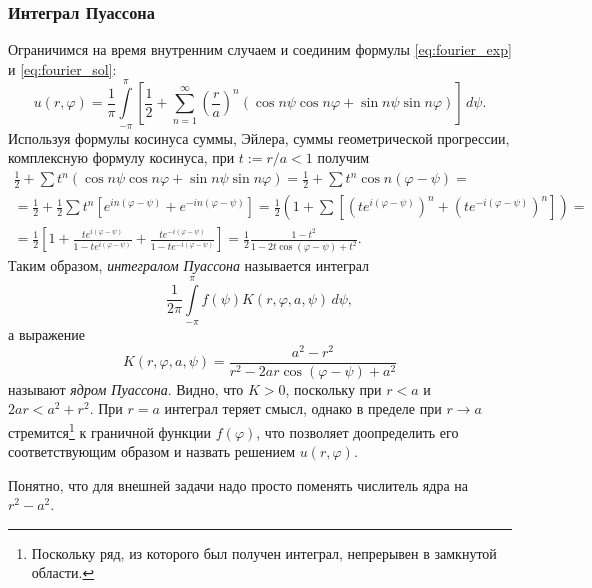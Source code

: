 \subsubsection{Интеграл Пуассона}
Ограничимся на время внутренним случаем и соединим формулы
\eqref{eq:fourier_exp} и \eqref{eq:fourier_sol}:
\[
  u(r,\varphi) = \frac{1}{\pi} \int\limits_{-\pi}^{\pi} \left[ \frac{1}{2} + \sum_{n=1}^\infty \left(
  \frac{r}{a} \right)^n (\cos n\psi\cos n\varphi + \sin n\psi \sin n\varphi
)\right] \, d\psi.
\]
Используя формулы косинуса суммы, Эйлера, суммы геометрической прогрессии,
комплексную формулу косинуса, при
$ t := r/a < 1 $ получим
\begin{multline*}
    \frac{1}{2} + \sum t^n(\cos n\psi \cos n\varphi + \sin n\psi \sin n\varphi)
    = \frac{1}{2} + \sum t^n \cos n(\varphi - \psi) =\\=
    \frac{1}{2} + \frac{1}{2}\sum t^n \left[ e^{in(\varphi-\psi)} +
    e^{-in(\varphi - \psi)} \right] = \frac{1}{2} \left( 1 + \sum \left[
(te^{i(\varphi - \psi)})^n + (te^{-i(\varphi - \psi)})^n \right]  \right) =\\=
  \frac{1}{2} \left[ 1 + \frac{te^{i(\varphi - \psi)}}{1 - te^{i(\varphi-\psi)}}
    + \frac{te^{-i(\varphi - \psi)}}{1 - te^{-i(\varphi-\psi)}}\right] =
    \frac{1}{2} \frac{1 - t^2}{1 - 2t\cos(\varphi - \psi) + t^2}.
\end{multline*}
Таким образом, \emph{интегралом Пуассона} называется интеграл 
\[
    \frac{1}{2\pi} \int\limits_{-\pi}^{\pi}f(\psi) K(r, \varphi, a,
    \psi)\,d\psi,
\]
а выражение  
\[
    K(r,\varphi, a,\psi) = \frac{a^2 - r^2}{r^2 - 2ar\cos(\varphi-\psi) + a^2}
\]
называют \emph{ядром Пуассона}. Видно, что $ K > 0 $, поскольку при $ r < a $ и
$ 2ar < a^2 + r^2 $. При $ r = a $ интеграл теряет смысл, однако в пределе при
$ r \to a $ стремится\footnote{Поскольку ряд, из
которого был получен интеграл, непрерывен в замкнутой области.} к граничной функции $ f(\varphi) $, что позволяет
доопределить его соответствующим образом и назвать решением $
u(r,\varphi) $.

Понятно, что для внешней задачи надо просто
поменять числитель ядра на $ r^2 - a^2 $.

